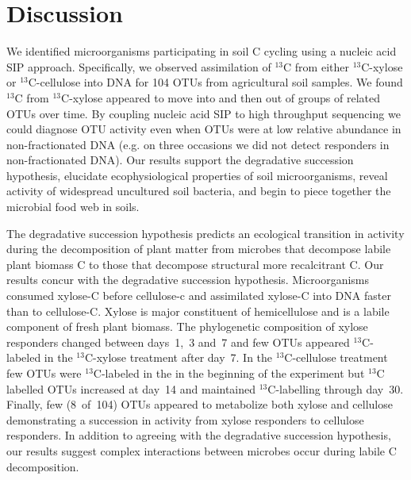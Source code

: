 \section{Discussion} 
We identified microorganisms participating in soil C cycling using a nucleic
acid SIP approach. Specifically, we observed assimilation of $^{13}$C from
either $^{13}$C-xylose or $^{13}$C-cellulose into DNA for 104 OTUs from
agricultural soil samples. We found $^{13}$C from $^{13}$C-xylose appeared to
move into and then out of groups of related OTUs over time. By coupling nucleic
acid SIP to high throughput sequencing we could diagnose OTU activity even when
OTUs were at low relative abundance in non-fractionated DNA (e.g. on three
occasions we did not detect responders in non-fractionated DNA). Our results
support the degradative succession hypothesis, elucidate ecophysiological
properties of soil microorganisms, reveal activity of widespread uncultured
soil bacteria, and begin to piece together the microbial food web in soils. 

The degradative succession hypothesis predicts an ecological transition in
activity during the decomposition of plant matter from microbes that decompose
labile plant biomass C to those that decompose structural more recalcitrant C.
Our results concur with the degradative succession hypothesis. Microorganisms
consumed xylose-C before cellulose-c and assimilated xylose-C into DNA faster
than to cellulose-C. Xylose is major constituent of hemicellulose and is
a labile component of fresh plant biomass. The phylogenetic composition of
xylose responders changed between days~1,~3 and~7 and few OTUs appeared
$^{13}$C-labeled in the $^{13}$C-xylose treatment after day~7. In the
$^{13}$C-cellulose treatment few OTUs were $^{13}$C-labeled in the in the
beginning of the experiment but $^{13}$C labelled OTUs increased at day~14 and
maintained $^{13}$C-labelling through day~30. Finally, few (8~of~104) OTUs
appeared to metabolize both xylose and cellulose demonstrating a succession in
activity from xylose responders to cellulose responders. In addition to
agreeing with the degradative succession hypothesis, our results suggest
complex interactions between microbes occur during labile C decomposition.

